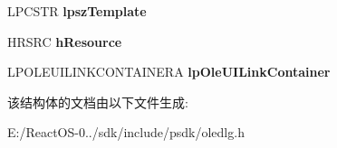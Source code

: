 \begin{DoxyCompactItemize}
\item 
\mbox{\label{structtag_o_l_e_u_i_e_d_i_t_l_i_n_k_s_a_a9ab15fd4bb92a1b0a818f204373161e4}} 
L\+P\+C\+S\+TR {\bfseries lpsz\+Template}
\item 
\mbox{\label{structtag_o_l_e_u_i_e_d_i_t_l_i_n_k_s_a_a895517d68007ba2340afd04e36bf87d2}} 
H\+R\+S\+RC {\bfseries h\+Resource}
\item 
\mbox{\label{structtag_o_l_e_u_i_e_d_i_t_l_i_n_k_s_a_a54a34b219bda3396206eb96703d3e958}} 
L\+P\+O\+L\+E\+U\+I\+L\+I\+N\+K\+C\+O\+N\+T\+A\+I\+N\+E\+RA {\bfseries lp\+Ole\+U\+I\+Link\+Container}
\end{DoxyCompactItemize}


该结构体的文档由以下文件生成\+:\begin{DoxyCompactItemize}
\item 
E\+:/\+React\+O\+S-\/0../sdk/include/psdk/oledlg.\+h\end{DoxyCompactItemize}
